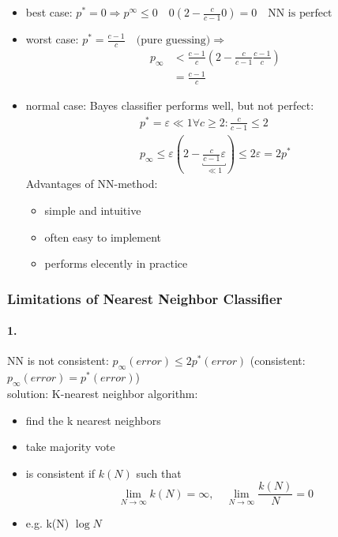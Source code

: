 \documentclass[11pt]{article}
\begin{document}
          \begin{itemize}
            \item best case: $p^*=0 \Rightarrow p^\infty \leq 0 \quad 0(2-\frac{c}
            {c-1}0)=0 \quad \text{NN is perfect}$
            \item worst case: $p^*=\frac{c-1}{c} \quad \text{(pure guessing)}
            \Rightarrow$
            \begin{equation*}
              \begin{align*}
                p_\infty &< \frac{c-1}{c}(2-\frac{c}{c-1}\frac{c-1}{c}) \\
                &= \frac{c-1}{c}
              \end{align*}
            \end{equation*}
            \item normal case: Bayes classifier performs well, but not perfect:
            \begin{equation*}
              \begin{multlined}
                p^* = \varepsilon \ll 1 \forall c \geq 2: \frac{c}{c-1} \leq 2 \\
                p_\infty \leq \varepsilon(2-\underbracket{\frac{c}{c-1}\varepsilon}_{\ll 1})
                \leq 2\varepsilon = 2p^*
              \end{multlined}
            \end{equation*}
            Advantages of NN-method:
            \begin{itemize}
              \item simple and intuitive
              \item often easy to implement
              \item performs elecently in practice
            \end{itemize}
          \end{itemize}
      \subsubsection{Limitations of Nearest Neighbor Classifier}
        \paragraph{1.}
          NN is not consistent: $p_\infty(error) \leq 2p^*(error)$ (consistent:
          $p_\infty(error) = p^*(error)$) \\
          solution: K-nearest neighbor algorithm:
          \begin{itemize}
            \item find the k nearest neighbors
            \item take majority vote
            \item is consistent if $k(N)$ such that
            \begin{equation*}
              \lim_{N \to \infty} k(N) = \infty, \quad \lim_{N \to \infty}
              \frac{k(N)}{N}=0
            \end{equation*}
            \item e.g. k(N) $\log N$
          \end{itemize}
\end{document}
